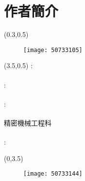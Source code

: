 \chapter*{作者簡介}
	{\begin{textblock}{6}(0.3,0.5)
	\begin{figure}
	\texttt{[image: 50733105]} 
	\end{figure}
	\end{textblock}}
	{\renewcommand\baselinestretch{0.99}\selectfont %
	{\begin{textblock}{15}(3.5,0.5)%
	\noindent\fontsize{16pt}{0em}\selectfont {}\enspace:\enspace
    \fontsize{16pt}{0em}\selectfont {}\\ \hspace*{\fill} \\[0.5em]
    \fontsize{16pt}{0em}\selectfont {}\enspace:\enspace
    \fontsize{16pt}{0em}\selectfont {} \\ %
    \hspace*{\fill} \\[0.5em]
    \fontsize{16pt}{0em}\selectfont {}\enspace:\enspace
    \fontsize{16pt}{0em}\selectfont {}\\ \hspace*{\fill} \\[0.5em]
    \fontsize{16pt}{0em}\selectfont \makebox[4em][s]{} \hspace{0.5em}
    \hspace{0.25em}精密機械工程科\\
    \hspace{0.5em} \\[0.5em]
    \fontsize{16pt}{0em}\selectfont {}\enspace:\enspace
    \end{textblock}}}
    {\begin{textblock}{6}(0,3.5)
	\begin{figure}
	\texttt{[image: 50733144]} 
	\end{figure}
	\end{textblock}}
